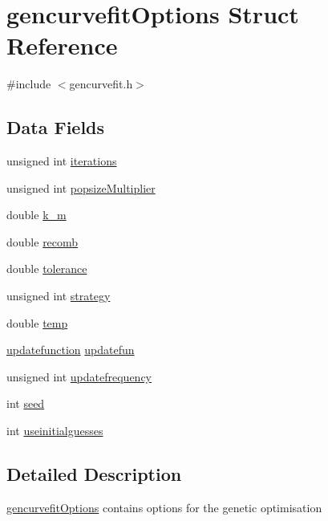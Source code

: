 \hypertarget{structgencurvefit_options}{
\section{gencurvefitOptions Struct Reference}
\label{structgencurvefit_options}
}


{\ttfamily \#include $<$gencurvefit.h$>$}

\subsection*{Data Fields}
\begin{DoxyCompactItemize}
\item 
unsigned int \hyperlink{structgencurvefit_options_a49884a390fe5592f17ab6795b728d63c}{iterations}
\item 
unsigned int \hyperlink{structgencurvefit_options_a7a71f8a56b1deaa38ea4f08c253a154f}{popsizeMultiplier}
\item 
double \hyperlink{structgencurvefit_options_a59bef0ce7a5cd9e1caa5cfa556bde37f}{k\_\-m}
\item 
double \hyperlink{structgencurvefit_options_ac0204c26d2cd7eb82bc13c199d03461e}{recomb}
\item 
double \hyperlink{structgencurvefit_options_a97eab6d709b80585fe9e8a54b1e3da27}{tolerance}
\item 
unsigned int \hyperlink{structgencurvefit_options_a09885471db33b126d97901a29aea53c4}{strategy}
\item 
double \hyperlink{structgencurvefit_options_a9fb78358ae4b0a049a0d1b37dc4cffec}{temp}
\item 
\hyperlink{gencurvefit_8h_a5e2662c4338bced26ad6aa5494fc1de2}{updatefunction} \hyperlink{structgencurvefit_options_ae8dada41d1098787c320af40b0320412}{updatefun}
\item 
unsigned int \hyperlink{structgencurvefit_options_a44f1fec3d8e41bea598a75b06af1becb}{updatefrequency}
\item 
int \hyperlink{structgencurvefit_options_a1447ad288a0a73454510f5777bdc3ed1}{seed}
\item 
int \hyperlink{structgencurvefit_options_af99f3583d5d6789c1aa1e9bf02f4c61c}{useinitialguesses}
\end{DoxyCompactItemize}


\subsection{Detailed Description}
\hyperlink{structgencurvefit_options}{gencurvefitOptions} contains options for the genetic optimisation 


